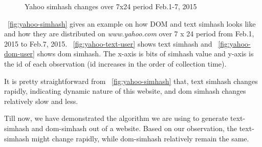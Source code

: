 \begin{figure}[t]
  \centering
  \caption{Yahoo simhash changes over 7x24 period Feb.1-7, 2015}
  \label{fig:yahoo-simhash}
\end{figure}

~\autoref{fig:yahoo-simhash} gives an example on how DOM and text simhash looks
like and how they are distributed on {\it www.yahoo.com} over 7 x 24 period from
Feb.1, 2015 to Feb.7, 2015. ~\autoref{fig:yahoo-text-user} shows text simhash
and ~\autoref{fig:yahoo-dom-user} shows dom simhash. The x-axis is bits of simhash value and
y-axis is the id of each observation (id increases in the order of collection time).

It is pretty straightforward from ~\autoref{fig:yahoo-simhash} that,
text simhash changes rapidly, indicating dynamic nature of this
website, and dom simhash changes relatively slow and less.

Till now, we have demonstrated the algorithm we are using to generate
text-simhash and dom-simhash out of a website. Based on our observation, the
text-simhash might change rapidly, while dom-simhash relatively remain the same.

